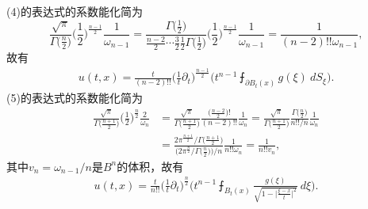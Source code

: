 \begin{itemize}
\begin{remark*}
    (4)的表达式的系数能化简为
    $$\frac{\sqrt{\pi}}{\varGamma\big(\frac{n}{2}\big)}\Big(\frac{1}{2}\Big)^\frac{n-1}{2}\frac{1}{\omega_{n-1}}
    =\frac{\varGamma\big(\frac{1}{2}\big)}{\frac{n-2}{2}\cdots\frac{3}{2}\frac{1}{2}\varGamma\big(\frac{1}{2}\big)}\Big(\frac{1}{2}\Big)^\frac{n-1}{2}\frac{1}{\omega_{n-1}}
    =\frac{1}{(n-2)!!\omega_{n-1}},$$
    故有\begin{align*}
        u(t,x)=\frac{t}{(n-2)!!}
        \Big(\frac{1}{t}\partial_t\Big)^\frac{n-1}{2}
        \bigg(t^{n-1}\intbar_{\!\!\!\partial B_t(x)}g(\xi)\>dS_\xi\bigg).
    \end{align*}
    (5)的表达式的系数能化简为
    \begin{align*}\frac{\sqrt{\pi}}{\varGamma\big(\frac{n+1}{2}\big)}\Big(\frac{1}{2}\Big)^\frac{n}{2}\frac{2}{\omega_n}
    &=\frac{\sqrt{\pi}}{\varGamma\big(\frac{n+1}{2}\big)}\frac{\big(\frac{n-2}{2}\big)!}{(n-2)!!}\frac{1}{\omega_n}
    =\frac{\sqrt{\pi}}{\varGamma\big(\frac{n+1}{2}\big)}\frac{\varGamma\big(\frac{n}{2}\big)}{n!!/n}\frac{1}{\omega_n}\\
    &=\frac{2\pi^\frac{n+1}{2}/\varGamma\big(\frac{n+1}{2}\big)}{\big(2\pi^\frac{n}{2}/\varGamma\big(\frac{n}{2}\big)\big)/n}\frac{1}{n!!\omega_n}
    =\frac{1}{n!!v_n},\end{align*}
    其中$v_n=\omega_{n-1}/n$是$B^n$的体积，故有\begin{align*}
        u(t,x)=\frac{t}{n!!}\Big(\frac{1}{t}\partial_t\Big)^\frac{n}{2}
        \Bigg(t^{n-1}\intbar_{\!\!\!B_t(x)}\frac{g(\xi)}{\sqrt{1-\big|\frac{\xi-x}{t}\big|^2}}\>d\xi\Bigg).
    \end{align*}
    \end{remark*}
\end{itemize}

